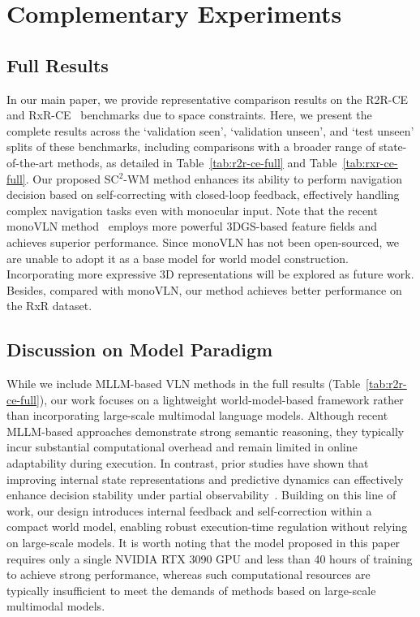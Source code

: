 \documentclass{article}
\theoremstyle{plain}
\theoremstyle{definition}
\theoremstyle{remark}
\begin{document}
\section{Complementary Experiments}\label{sec:exper}
\subsection{Full Results}
In our main paper, we provide representative comparison results on the R2R-CE~\cite{krantz2020beyond} and RxR-CE~\cite{krantz2020beyond} benchmarks due to space constraints. Here, we present the complete results across the `validation seen', `validation unseen', and `test unseen' splits of these benchmarks, including comparisons with a broader range of state-of-the-art methods, as detailed in Table~\ref{tab:r2r-ce-full} and Table~\ref{tab:rxr-ce-full}. Our proposed SC$^2$-WM method enhances its ability to perform navigation decision based on self-correcting with closed-loop feedback, effectively handling complex navigation tasks even with monocular input.
Note that the recent monoVLN method~\citep{Lu2025monoVLN} employs more powerful 3DGS-based feature fields and achieves superior performance. Since monoVLN has not been open-sourced, we are unable to adopt it as a base model for world model construction. Incorporating more expressive 3D representations will be explored as future work. Besides, compared with monoVLN, our method achieves better performance on the RxR dataset.


\subsection{Discussion on Model Paradigm}\label{sec:further discussion}
While we include MLLM-based VLN methods in the full results (Table~\ref{tab:r2r-ce-full}), our work focuses on a lightweight world-model-based framework rather than incorporating large-scale multimodal language models. Although recent MLLM-based approaches demonstrate strong semantic reasoning, they typically incur substantial computational overhead and remain limited in online adaptability during execution. In contrast, prior studies have shown that improving internal state representations and predictive dynamics can effectively enhance decision stability under partial observability~\cite{Yao2025navmorph,wang2025g3d,huang2025unemo,an2024etpnav}. Building on this line of work, our design introduces internal feedback and self-correction within a compact world model, enabling robust execution-time regulation without relying on large-scale models.
It is worth noting that the model proposed in this paper requires only a single NVIDIA RTX 3090 GPU and less than 40 hours of training to achieve strong performance, whereas such computational resources are typically insufficient to meet the demands of methods based on large-scale multimodal models.
\end{document}
